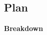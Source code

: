 \documentclass[ %
                    author={Callum Pearce},
                supervisor={Dr. Neill Campbell},
                    degree={MEng},
                     title={How effective are Temporal difference learning methods in reducing the number of zero contribution light paths in Path tracing?},
                  subtitle={},
                      type={research},
                      year={2019} ]{dissertation}
\begin{document}
\begin{comment}
{\bf A compulsory chapter,     of roughly $10$ pages} 
\vspace{1cm} 

\noindent
This chapter is intended to describe the technical basis on which execution
of the project depends.  The goal is to provide a detailed explanation of
the specific problem at hand, and existing work that is relevant (e.g., an
existing algorithm that you use, alternative solutions proposed, supporting
technologies).  

Per the same advice in the handbook, note there is a subtly difference from
this and a full-blown literature review (or survey).  The latter might try
to capture and organise (e.g., categorise somehow) {\em all} related work,
potentially offering meta-analysis, whereas here the goal is simple to
ensure the dissertation is self-contained.  Put another way, after reading 
this chapter a non-expert reader should have obtained enough background to 
understand what {\em you} have done (by reading subsequent sections), then 
accurately assess your work.  You might view an additional goal as giving 
the reader confidence that you are able to absorb, understand and clearly 
communicate highly technical material.
\end{comment}

\subsection{Plan}
\textbf{Breakdown}
\end{document}

